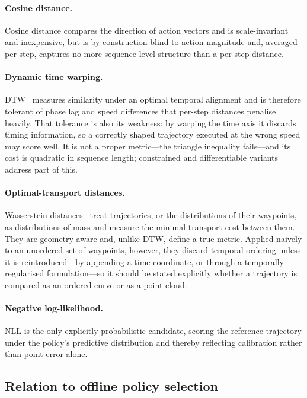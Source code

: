 \documentclass[english,12pt,a4paper,pdftex,elec,utf8]{aaltothesis}
\begin{document}
\paragraph{Cosine distance.}
Cosine distance compares the direction of action vectors and is scale-invariant and inexpensive, but is by construction blind to action magnitude and, averaged per step, captures no more sequence-level structure than a per-step distance.

\paragraph{Dynamic time warping.}
DTW~\cite{sakoe1978dtw, muller2007information} measures similarity under an optimal temporal alignment and is therefore tolerant of phase lag and speed differences that per-step distances penalise heavily. That tolerance is also its weakness: by warping the time axis it discards timing information, so a correctly shaped trajectory executed at the wrong speed may score well. It is not a proper metric---the triangle inequality fails---and its cost is quadratic in sequence length; constrained and differentiable variants
\citep{cuturi2017soft} address part of this.

\paragraph{Optimal-transport distances.}
Wasserstein distances~\cite{villani2009optimal, peyre2019computational} treat trajectories, or the distributions of their waypoints, as distributions of mass and measure the minimal transport cost between them. They are geometry-aware and, unlike DTW, define a true metric. Applied naively to an unordered set of
waypoints, however, they discard temporal ordering unless it is reintroduced---by appending a time coordinate, or through a temporally regularised formulation---so it should be stated explicitly whether a trajectory is compared as an ordered curve or as a point cloud.

\paragraph{Negative log-likelihood.}
NLL is the only explicitly probabilistic candidate, scoring the reference
trajectory under the policy's predictive distribution and thereby reflecting
calibration rather than point error alone. 

\subsection{Relation to offline policy selection}
\label{subsec:ops}
\end{document}
